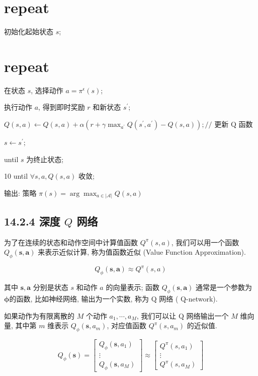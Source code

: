 \documentclass[10pt]{article}
\begin{document}
\section*{repeat}
初始化起始状态 $s$;

\section*{repeat}
在状态 $s$, 选择动作 $a=\pi^{\epsilon}(s)$;

执行动作 $a$, 得到即时奖励 $r$ 和新状态 $s^{\prime}$;

$Q(s, a) \leftarrow Q(s, a)+\alpha\left(r+\gamma \max _{a^{\prime}} Q\left(s^{\prime}, a^{\prime}\right)-Q(s, a)\right) ; / /$ 更新 $\mathrm{Q}$ 函数

$s \leftarrow s^{\prime}$;

until $s$ 为终止状态;

10 until $\forall s, a, Q(s, a)$ 收敛;

输出: 策略 $\pi(s)=\arg \max _{a \in|\mathcal{A}|} Q(s, a)$

\subsection*{14.2.4 深度 $Q$ 网络}
为了在连续的状态和动作空间中计算值函数 $Q^{\pi}(s, a)$, 我们可以用一个函数 $Q_{\phi}(\boldsymbol{s}, \boldsymbol{a})$ 来表示近似计算, 称为值函数近似 (Value Function Approximation).


\begin{equation*}
Q_{\phi}(\boldsymbol{s}, \boldsymbol{a}) \approx Q^{\pi}(s, a) \tag{14.41}
\end{equation*}


其中 $\boldsymbol{s}, \boldsymbol{a}$ 分别是状态 $s$ 和动作 $a$ 的向量表示; 函数 $Q_{\phi}(\boldsymbol{s}, \boldsymbol{a})$ 通常是一个参数为 $\boldsymbol{\phi}$的函数, 比如神经网络, 输出为一个实数, 称为 $\mathrm{Q}$ 网络 ( $\mathrm{Q}$-network).

如果动作为有限离散的 $M$ 个动作 $a_{1}, \cdots, a_{M}$, 我们可以让 $\mathrm{Q}$ 网络输出一个 $M$ 维向量, 其中第 $m$ 维表示 $Q_{\phi}\left(\boldsymbol{s}, a_{m}\right)$, 对应值函数 $Q^{\pi}\left(s, a_{m}\right)$ 的近似值.

\[
Q_{\phi}(\boldsymbol{s})=\left[\begin{array}{c}
Q_{\phi}\left(\boldsymbol{s}, a_{1}\right)  \tag{14.42}\\
\vdots \\
Q_{\phi}\left(\boldsymbol{s}, a_{M}\right)
\end{array}\right] \approx\left[\begin{array}{c}
Q^{\pi}\left(s, a_{1}\right) \\
\vdots \\
Q^{\pi}\left(s, a_{M}\right)
\end{array}\right]
\]
\end{document}

